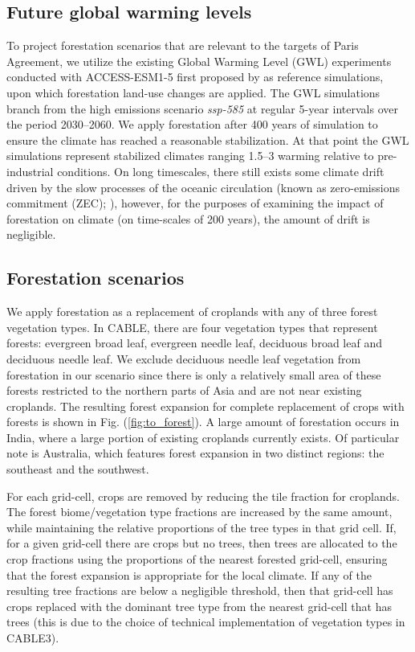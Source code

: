\documentclass[]{article}
\begin{document}
\subsection{Future global warming levels}

To project forestation scenarios that are relevant to the targets of Paris Agreement, we utilize the existing Global Warming Level (GWL) experiments conducted with ACCESS-ESM1-5 first proposed by \cite{king_studying_2021} as reference simulations, upon which forestation land-use changes are applied.
The GWL simulations branch from the high emissions scenario \textit{ssp-585} \parencite{oneill_scenario_2016, jones_c4mip_2016} at regular 5-year intervals over the period 2030--2060.
We apply forestation after 400 years of simulation to ensure the climate has reached a reasonable stabilization.
At that point the GWL simulations represent stabilized climates ranging 1.5--3 \textcelsius  warming relative to pre-industrial conditions.
On long timescales, there still exists some climate drift driven by the slow processes of the oceanic circulation (known as zero-emissions commitment (ZEC); \cite{chamberlain_southern_2023}), however, for the purposes of examining the impact of forestation on climate (on time-scales of 200 years), the amount of drift is negligible.

\subsection{Forestation scenarios}

We apply forestation as a replacement of croplands with any of three forest vegetation types.
In CABLE, there are four vegetation types that represent forests: evergreen broad leaf, evergreen needle leaf, deciduous broad leaf and deciduous needle leaf.
We exclude deciduous needle leaf vegetation from forestation in our scenario since there is only a relatively small area of these forests restricted to the northern parts of Asia and are not near existing croplands.
The resulting forest expansion for complete replacement of crops with forests is shown in Fig. (\ref{fig:to_forest}).
A large amount of forestation occurs in India, where a large portion of existing croplands currently exists.
Of particular note is Australia, which features forest expansion in two distinct regions: the southeast and the southwest.

For each grid-cell, crops are removed by reducing the tile fraction for croplands.
The forest biome/vegetation type fractions are increased by the same amount, while maintaining the relative proportions of the tree types in that grid cell.
If, for a given grid-cell there are crops but no trees, then trees are allocated to the crop fractions using the proportions of the nearest forested grid-cell, ensuring that the forest expansion is appropriate for the local climate.
If any of the resulting tree fractions are below a negligible threshold, then that grid-cell has crops replaced with the dominant tree type from the nearest grid-cell that has trees (this is due to the choice of technical implementation of vegetation types in CABLE3).
\end{document}
